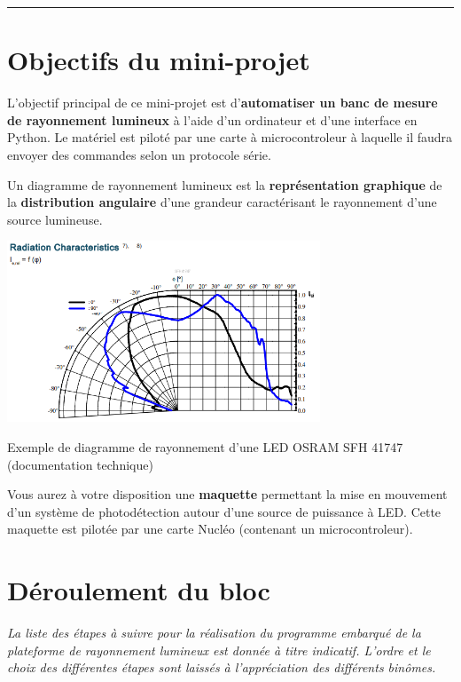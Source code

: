 \documentclass[a4paper,11pt,titlepage]{article} %
\begin{document}
\noindent \rule{\linewidth}{1pt}



\section{Objectifs du mini-projet}

L'objectif principal de ce mini-projet est d'\textbf{automatiser un banc de mesure de rayonnement lumineux} à l'aide d'un ordinateur et d'une interface en Python. Le matériel est piloté par une carte à microcontroleur à laquelle il faudra envoyer des commandes selon un protocole série.

\medskip

Un diagramme de rayonnement lumineux est la \textbf{représentation graphique} de la \textbf{distribution angulaire} d'une grandeur caractérisant le rayonnement d'une source lumineuse.

\begin{center}
	\includegraphics[width=0.7\textwidth]{images/osram_sfh41747.png}
	
	Exemple de diagramme de rayonnement d'une LED OSRAM SFH 41747 (documentation technique)
\end{center}


\medskip

Vous aurez à votre disposition une \textbf{maquette} permettant la mise en mouvement d'un système de photodétection autour d'une source de puissance à LED. Cette maquette est pilotée par une carte Nucléo (contenant un microcontroleur).



\section{Déroulement du bloc}

\textit{La liste des étapes à suivre pour la réalisation du programme embarqué de la plateforme de rayonnement lumineux est donnée à titre indicatif. L'ordre et le choix des différentes étapes sont laissés à l'appréciation des différents binômes.}
\end{document}
